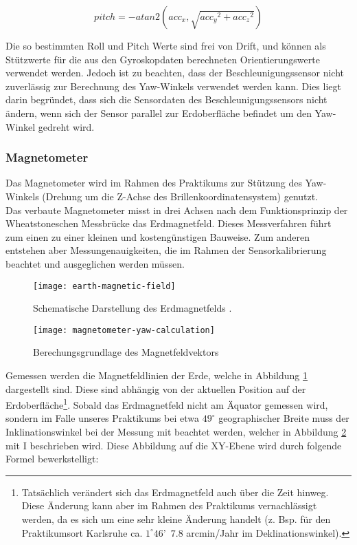 \begin{equation}
    pitch = -atan2(acc_x, \sqrt{ {acc_y}^2 + {acc_z}^2 })
\end{equation}

Die so bestimmten Roll und Pitch Werte sind frei von Drift, und können als Stützwerte für die aus den Gyroskopdaten berechneten Orientierungswerte verwendet werden. Jedoch ist zu beachten, dass der Beschleunigungssensor nicht zuverlässig zur Berechnung des Yaw-Winkels verwendet werden kann. Dies liegt darin begründet, dass sich die Sensordaten des Beschleunigungssensors nicht ändern, wenn sich der Sensor parallel zur Erdoberfläche befindet um den Yaw-Winkel gedreht wird.



\subsubsection{Magnetometer}
\label{headtracking_magnetometer_subsubsec}
Das Magnetometer wird im Rahmen des Praktikums zur Stützung des Yaw-Winkels (Drehung um die Z-Achse des Brillenkoordinatensystem) genutzt.\\
Das verbaute Magnetometer misst in drei Achsen nach dem Funktionsprinzip der Wheatstoneschen Messbrücke \cite{renaudin2010complete} das Erdmagnetfeld.
Dieses Messverfahren führt zum einen zu einer kleinen und kostengünstigen Bauweise.
Zum anderen entstehen aber Messungenauigkeiten, die im Rahmen der Sensorkalibrierung beachtet und ausgeglichen werden müssen.

\begin{figure}
   \centering
   \texttt{[image: earth-magnetic-field]}
   \caption[mag_world]{Schematische Darstellung des Erdmagnetfelds \cite{mag_world_source}.}
   \label{fig:mag_world}
\end{figure}

\begin{figure}
   \centering
   \texttt{[image: magnetometer-yaw-calculation]}
   \caption[mag_mapping]{Berechungsgrundlage des Magnetfeldvektors}
   \label{fig:mag_mapping}
\end{figure}

Gemessen werden die Magnetfeldlinien der Erde, welche in Abbildung \ref{fig:mag_world} dargestellt sind.
Diese sind abhängig von der aktuellen Position auf der Erdoberfläche\footnote{Tatsächlich verändert sich das Erdmagnetfeld auch über die Zeit hinweg.
Diese Änderung kann aber im Rahmen des Praktikums vernachlässigt werden, da es sich um eine sehr kleine Änderung handelt (z. Bsp. für den Praktikumsort Karlsruhe ca. $1^\circ 46$'~$7.8$ arcmin/Jahr im Deklinationswinkel).}.
Sobald das Erdmagnetfeld nicht am Äquator gemessen wird, sondern im Falle unseres Praktikums bei etwa $49^\circ$ geographischer Breite muss der Inklinationswinkel bei der Messung mit beachtet werden, welcher in Abbildung \ref{fig:mag_mapping} mit I beschrieben wird.
Diese Abbildung auf die XY-Ebene wird durch folgende Formel bewerkstelligt:

